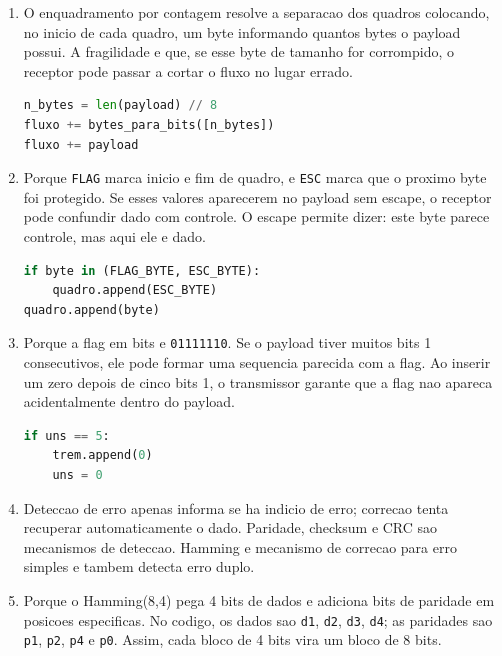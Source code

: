 \documentclass[12pt,a4paper]{article}
\begin{document}
\begin{enumerate}
  \begin{lstlisting}[language=Python]
checksum = (~soma) & 0xFFFF
total = soma_complemento1(
    bits_para_palavras16(payload) + bits_para_palavras16(bits[-16:])
)
return payload, total == 0xFFFF
  \end{lstlisting}

  \item O enquadramento por contagem resolve a separacao dos quadros colocando, no inicio de cada quadro, um byte informando quantos bytes o payload possui. A fragilidade e que, se esse byte de tamanho for corrompido, o receptor pode passar a cortar o fluxo no lugar errado.

  \begin{lstlisting}[language=Python]
n_bytes = len(payload) // 8
fluxo += bytes_para_bits([n_bytes])
fluxo += payload
  \end{lstlisting}

  \item Porque \texttt{FLAG} marca inicio e fim de quadro, e \texttt{ESC} marca que o proximo byte foi protegido. Se esses valores aparecerem no payload sem escape, o receptor pode confundir dado com controle. O escape permite dizer: este byte parece controle, mas aqui ele e dado.

  \begin{lstlisting}[language=Python]
if byte in (FLAG_BYTE, ESC_BYTE):
    quadro.append(ESC_BYTE)
quadro.append(byte)
  \end{lstlisting}

  \item Porque a flag em bits e \texttt{01111110}. Se o payload tiver muitos bits 1 consecutivos, ele pode formar uma sequencia parecida com a flag. Ao inserir um zero depois de cinco bits 1, o transmissor garante que a flag nao apareca acidentalmente dentro do payload.

  \begin{lstlisting}[language=Python]
if uns == 5:
    trem.append(0)
    uns = 0
  \end{lstlisting}

  \item Deteccao de erro apenas informa se ha indicio de erro; correcao tenta recuperar automaticamente o dado. Paridade, checksum e CRC sao mecanismos de deteccao. Hamming e mecanismo de correcao para erro simples e tambem detecta erro duplo.

  \item Porque o Hamming(8,4) pega 4 bits de dados e adiciona bits de paridade em posicoes especificas. No codigo, os dados sao \texttt{d1}, \texttt{d2}, \texttt{d3}, \texttt{d4}; as paridades sao \texttt{p1}, \texttt{p2}, \texttt{p4} e \texttt{p0}. Assim, cada bloco de 4 bits vira um bloco de 8 bits.


\end{enumerate}
\end{document}

